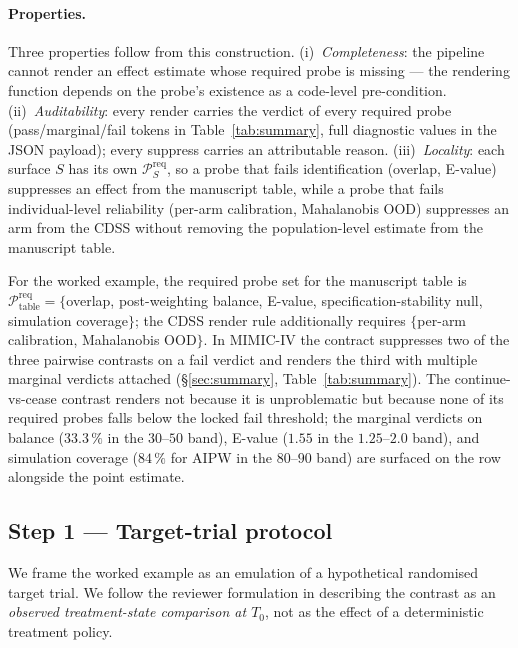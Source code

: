 \documentclass[11pt,a4paper]{article}
\begin{document}
\paragraph{Properties.} Three properties follow from this construction. (i)~\emph{Completeness}: the pipeline cannot render an effect estimate whose required probe is missing --- the rendering function depends on the probe's existence as a code-level pre-condition. (ii)~\emph{Auditability}: every render carries the verdict of every required probe (pass/marginal/fail tokens in Table~\ref{tab:summary}, full diagnostic values in the JSON payload); every suppress carries an attributable reason. (iii)~\emph{Locality}: each surface $S$ has its own $\mathcal{P}_S^{\text{req}}$, so a probe that fails identification (overlap, E-value) suppresses an effect from the manuscript table, while a probe that fails individual-level reliability (per-arm calibration, Mahalanobis OOD) suppresses an arm from the CDSS without removing the population-level estimate from the manuscript table.

For the worked example, the required probe set for the manuscript table is $\mathcal{P}^{\text{req}}_{\text{table}} = \{$overlap, post-weighting balance, E-value, specification-stability null, simulation coverage$\}$; the CDSS render rule additionally requires $\{$per-arm calibration, Mahalanobis OOD$\}$. In MIMIC-IV the contract suppresses two of the three pairwise contrasts on a fail verdict and renders the third with multiple marginal verdicts attached (\S\ref{sec:summary}, Table~\ref{tab:summary}). The continue-vs-cease contrast renders not because it is unproblematic but because none of its required probes falls below the locked fail threshold; the marginal verdicts on balance ($33.3\,\%$ in the $30$--$50$ band), E-value ($1.55$ in the $1.25$--$2.0$ band), and simulation coverage ($84\,\%$ for AIPW in the $80$--$90$ band) are surfaced on the row alongside the point estimate.

\subsection{Step 1 --- Target-trial protocol}
We frame the worked example as an emulation of a hypothetical randomised target trial. We follow the reviewer formulation in describing the contrast as an \emph{observed treatment-state comparison at $T_0$}, not as the effect of a deterministic treatment policy.
\end{document}
